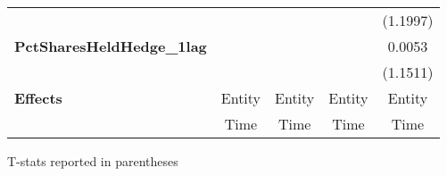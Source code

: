 \begin{center}
\begin{tabular}{lcccc}
\textbf{ }                                 &                     &                                &                     &             (1.1997)             \\
\textbf{PctSharesHeldHedge\_1lag}          &                     &                                &                     &              0.0053              \\
\textbf{ }                                 &                     &                                &                     &             (1.1511)             \\
\midrule
\textbf{Effects}                           &        Entity       &             Entity             &        Entity       &              Entity              \\
& Time & Time & Time & Time\\
\bottomrule
\end{tabular}
\end{center}

T-stats reported in parentheses
